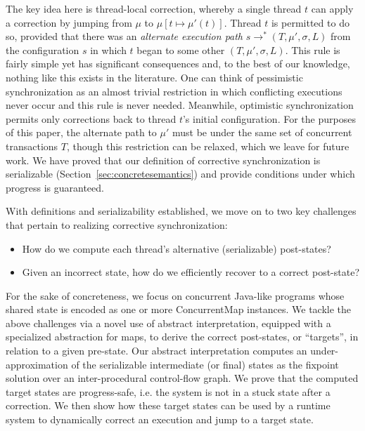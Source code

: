 The key idea here is thread-local correction, whereby a single
thread $t$ can apply a correction by jumping from $\mu$ to
$\mu[t \mapsto \mu'(t)]$. Thread $t$ is permitted to do so,
  provided that there was an \emph{alternate execution path}
  $s \rightarrow^{*} (T,\mu',\sigma,L)$ from the configuration $s$
  in which $t$ began to some other $(T,\mu',\sigma,L)$.
%
This rule is fairly simple yet has significant consequences and, to
the best of our knowledge, nothing like this exists in the
literature. One can think of pessimistic synchronization as an almost
trivial restriction in which conflicting executions never occur and
this rule is never needed. Meanwhile, optimistic synchronization
permits only corrections back to thread $t$'s initial
configuration.
%
For the purposes of this paper, the alternate path to
$\mu'$ must be under the same set of concurrent transactions $T$,
though this restriction can be relaxed, which we leave for future work.
%
We have proved that our definition of corrective synchronization is serializable
(Section~\ref{sec:concretesemantics}) and provide conditions
under which progress is guaranteed.

%
With definitions and serializability established, we move on to two key challenges
that pertain to realizing corrective synchronization:
\begin{itemize}
\item How do we compute each thread's alternative (serializable) post-states?
\item Given an incorrect state, how do we efficiently recover to a correct post-state?
\end{itemize}
%
For the sake of concreteness, we focus on concurrent Java-like
programs whose shared state is encoded as one or more {\sf
  ConcurrentMap} instances.  We tackle the above challenges via a
novel use of abstract interpretation, equipped with a specialized
abstraction for maps, to derive the correct post-states, or ``targets'', in relation to
a given pre-state.
%
Our abstract interpretation computes an
under-approximation of the serializable intermediate (or final) states
as the fixpoint solution over an inter-procedural control-flow graph.
%
We prove that the computed target states are progress-safe, i.e. the system is not in a stuck state after a correction.
%
We then show how these target states can be used by a runtime system to
dynamically correct an execution and jump to a target state. 


